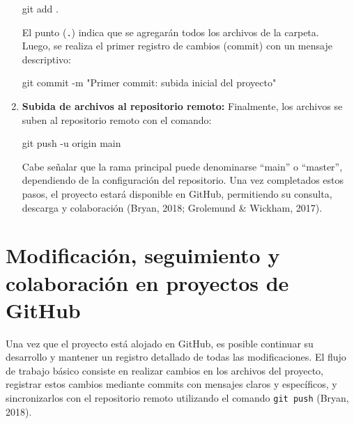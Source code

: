 \documentclass[
  spanish,
  a4paper,
  DIV=11,
  numbers=noendperiod,
  onepage,
  openany]{scrreprt}
\newenvironment{Shaded}{\begin{snugshade}}{\end{snugshade}}
\newcommand{\NormalTok}[1]{\textcolor[rgb]{0.00,0.23,0.31}{#1}}
\newcommand{\SpecialCharTok}[1]{\textcolor[rgb]{0.37,0.37,0.37}{#1}}
\newcommand{\StringTok}[1]{\textcolor[rgb]{0.13,0.47,0.30}{#1}}
\begin{document}
\begin{enumerate}
\begin{Shaded}
\begin{Highlighting}[]
\NormalTok{git add .}
\end{Highlighting}
\end{Shaded}

  El punto (\texttt{.}) indica que se agregarán todos los archivos de la
  carpeta.\\

  Luego, se realiza el primer registro de cambios (commit) con un
  mensaje descriptivo:

\begin{Shaded}
\begin{Highlighting}[]
\NormalTok{git commit }\SpecialCharTok{{-}}\NormalTok{m }\StringTok{"Primer commit: subida inicial del proyecto"}
\end{Highlighting}
\end{Shaded}
\item
  \textbf{Subida de archivos al repositorio remoto:} Finalmente, los
  archivos se suben al repositorio remoto con el comando:

\begin{Shaded}
\begin{Highlighting}[]
\NormalTok{git push }\SpecialCharTok{{-}}\NormalTok{u origin main}
\end{Highlighting}
\end{Shaded}

  Cabe señalar que la rama principal puede denominarse ``main'' o
  ``master'', dependiendo de la configuración del repositorio. Una vez
  completados estos pasos, el proyecto estará disponible en GitHub,
  permitiendo su consulta, descarga y colaboración (Bryan, 2018;
  Grolemund \& Wickham, 2017).
\end{enumerate}

\section{Modificación, seguimiento y colaboración en proyectos de
GitHub}\label{modificaciuxf3n-seguimiento-y-colaboraciuxf3n-en-proyectos-de-github}

Una vez que el proyecto está alojado en GitHub, es posible continuar su
desarrollo y mantener un registro detallado de todas las modificaciones.
El flujo de trabajo básico consiste en realizar cambios en los archivos
del proyecto, registrar estos cambios mediante commits con mensajes
claros y específicos, y sincronizarlos con el repositorio remoto
utilizando el comando \texttt{git\ push} (Bryan, 2018).
\end{document}
